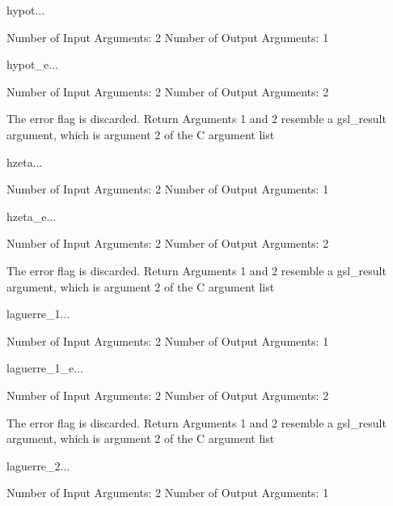 \begin{funcdesc}{hypot}{...}

    Number of Input  Arguments:  2
    Number of Output Arguments:  1
\end{funcdesc}

\begin{funcdesc}{hypot_e}{...}

    Number of Input  Arguments:  2
    Number of Output Arguments:  2

The error flag is discarded.
Return Arguments 1 and 2 resemble a gsl_result argument,
	which is  argument 2 of the C argument list

\end{funcdesc}

\begin{funcdesc}{hzeta}{...}

    Number of Input  Arguments:  2
    Number of Output Arguments:  1
\end{funcdesc}

\begin{funcdesc}{hzeta_e}{...}

    Number of Input  Arguments:  2
    Number of Output Arguments:  2

The error flag is discarded.
Return Arguments 1 and 2 resemble a gsl_result argument,
	which is  argument 2 of the C argument list

\end{funcdesc}

\begin{funcdesc}{laguerre_1}{...}

    Number of Input  Arguments:  2
    Number of Output Arguments:  1
\end{funcdesc}

\begin{funcdesc}{laguerre_1_e}{...}

    Number of Input  Arguments:  2
    Number of Output Arguments:  2

The error flag is discarded.
Return Arguments 1 and 2 resemble a gsl_result argument,
	which is  argument 2 of the C argument list

\end{funcdesc}

\begin{funcdesc}{laguerre_2}{...}

    Number of Input  Arguments:  2
    Number of Output Arguments:  1
\end{funcdesc}

